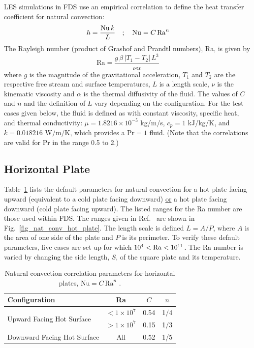\documentclass[11pt]{book}
\begin{document}
LES simulations in FDS use an empirical correlation to define the heat transfer coefficient for natural convection:
\begin{equation}
  h = \frac{{\rm Nu} \, k}{L} \quad ; \quad \mathrm{Nu} = C \,\mathrm{Ra}^n
\end{equation}
The Rayleigh number (product of Grashof and Prandtl numbers), Ra, is given by
\begin{equation}
\label{eq:rayleigh_number}
\mathrm{Ra} = \frac{g \, \beta \, |T_1-T_2| \, L^3}{\nu\alpha}
\end{equation}
where $g$ is the magnitude of the gravitational acceleration, $T_1$ and $T_2$ are the respective free stream and surface temperatures, $L$ is a length scale, $\nu$ is the kinematic viscosity and $\alpha$ is the thermal diffusivity of the fluid. The values of $C$ and $n$ and the definition of $L$ vary depending on the configuration. For the test cases given below, the fluid is defined as  with constant viscosity, specific heat, and thermal conductivity: $\mu = 1.8216 \times 10^{-5}$ \unit{kg/m/s}, $c_p = 1$ \unit{kJ/kg/K}, and $k = 0.018216$ \unit{W/m/K}, which provides a $\mathrm{Pr}=1$ fluid. (Note that the correlations are valid for Pr in the range 0.5 to 2.)

\subsection{Horizontal Plate}
\label{sec:nat_conv_hot_plate}

Table~\ref{tab:nat_conv_horizontal_default} lists the default parameters for natural convection for a hot plate facing upward (equivalent to a cold plate facing downward) \underline{or} a hot plate facing downward (cold plate facing upward). The listed ranges for the Ra number are those used within FDS. The ranges given in Ref.~\cite{Incropera:1} are shown in Fig.~\ref{fig_nat_conv_hot_plate}. The length scale is defined $L=A/P$, where $A$ is the area of one side of the plate and $P$ is its perimeter. To verify these default parameters, five cases are set up for which $10^4 < {\rm Ra} < 10^{11}$. The Ra number is varied by changing the side length, $S$, of the square plate and its temperature.

\begin{table}[ht]
\centering
\caption[Natural convection correlation parameters for horizontal plates]{Natural convection correlation parameters for horizontal plates, $\mathrm{Nu}=C \, \mathrm{Ra}^n$ \cite{Incropera:1}.}
\label{tab:nat_conv_horizontal_default}
\begin{tabular}{lccc}
Configuration                                & Ra                       & $C$   & $n$  \\
\hline
\multirow{2}{*}{Upward Facing Hot Surface}   & $ <1 \times 10^7$        & 0.54  & 1/4  \\
                                             & $ >1 \times 10^7$        & 0.15  & 1/3  \\
Downward Facing Hot Surface &  All                                      & 0.52  & 1/5  \\
\end{tabular}
\end{table}
\end{document}
